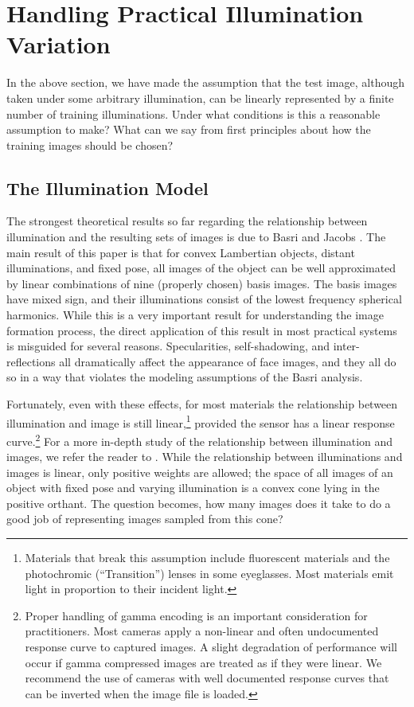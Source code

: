 \documentclass[10pt,journal,letterpaper,compsoc]{IEEEtran} %
\begin{document}
\section{Handling Practical Illumination Variation}\label{sec:illumination}
In the above section, we have made the assumption that the test image, although taken under some arbitrary illumination, can be linearly represented by a finite number of training illuminations.  Under what conditions is this a reasonable assumption to make?  What can we say from first principles about how the training images should be chosen?

\subsection{The Illumination Model}

The strongest theoretical results so far regarding the relationship
between illumination and the resulting sets of images is due to Basri and Jacobs \cite{Basri2003-PAMI}.
The main result of this paper is that for convex Lambertian objects, distant illuminations, and fixed pose,
all images of the object can be well approximated by linear combinations of
nine (properly chosen) basis images.  The basis images have mixed sign, and
their illuminations consist of the lowest frequency spherical harmonics.
While this is a very important result for understanding the image
formation process, the direct application of this result in most practical
systems is misguided for several reasons.
Specularities, self-shadowing, and inter-reflections all dramatically affect the appearance of face images,
and they all do so in a way that violates the modeling assumptions of the Basri analysis.

Fortunately, even with these effects, for most materials the relationship between
illumination and image is still linear,\footnote{Materials that break
this assumption include fluorescent materials and the photochromic (``Transition'') lenses
in some eyeglasses.  Most materials emit light in proportion to their
incident light.} provided the sensor has a linear response curve.\footnote{Proper handling of gamma encoding is an important consideration for
practitioners.  Most cameras apply a non-linear and often undocumented response
curve to captured images.  A slight degradation of performance will occur if
gamma compressed images are treated as if they were linear.  We recommend the use
of cameras with well documented response curves that can be inverted when the
image file is loaded.}
For a more in-depth study
of the relationship between illumination and images, we refer the reader to
\cite{belhumeur1998set}.
While the relationship between illuminations and images is linear,
only positive weights are allowed; the space of all images of an object with
fixed pose and varying illumination is a convex cone lying in the positive
orthant. The question becomes, how many images does it take to do a good job
of representing images sampled from this cone?
\end{document}
